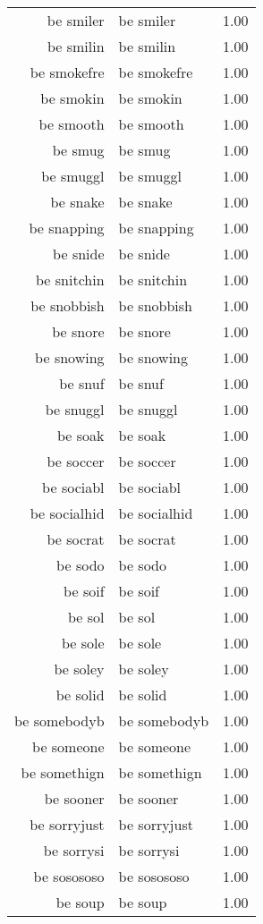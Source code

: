 \begin{table}[ht]
\begin{tabular}{rlr}
  be smiler & be smiler & 1.00 \\ 
  be smilin & be smilin & 1.00 \\ 
  be smokefre & be smokefre & 1.00 \\ 
  be smokin & be smokin & 1.00 \\ 
  be smooth & be smooth & 1.00 \\ 
  be smug & be smug & 1.00 \\ 
  be smuggl & be smuggl & 1.00 \\ 
  be snake & be snake & 1.00 \\ 
  be snapping & be snapping & 1.00 \\ 
  be snide & be snide & 1.00 \\ 
  be snitchin & be snitchin & 1.00 \\ 
  be snobbish & be snobbish & 1.00 \\ 
  be snore & be snore & 1.00 \\ 
  be snowing & be snowing & 1.00 \\ 
  be snuf & be snuf & 1.00 \\ 
  be snuggl & be snuggl & 1.00 \\ 
  be soak & be soak & 1.00 \\ 
  be soccer & be soccer & 1.00 \\ 
  be sociabl & be sociabl & 1.00 \\ 
  be socialhid & be socialhid & 1.00 \\ 
  be socrat & be socrat & 1.00 \\ 
  be sodo & be sodo & 1.00 \\ 
  be soif & be soif & 1.00 \\ 
  be sol & be sol & 1.00 \\ 
  be sole & be sole & 1.00 \\ 
  be soley & be soley & 1.00 \\ 
  be solid & be solid & 1.00 \\ 
  be somebodyb & be somebodyb & 1.00 \\ 
  be someone & be someone & 1.00 \\ 
  be somethign & be somethign & 1.00 \\ 
  be sooner & be sooner & 1.00 \\ 
  be sorryjust & be sorryjust & 1.00 \\ 
  be sorrysi & be sorrysi & 1.00 \\ 
  be sosososo & be sosososo & 1.00 \\ 
  be soup & be soup & 1.00 \\ 

\end{tabular}
\end{table}
